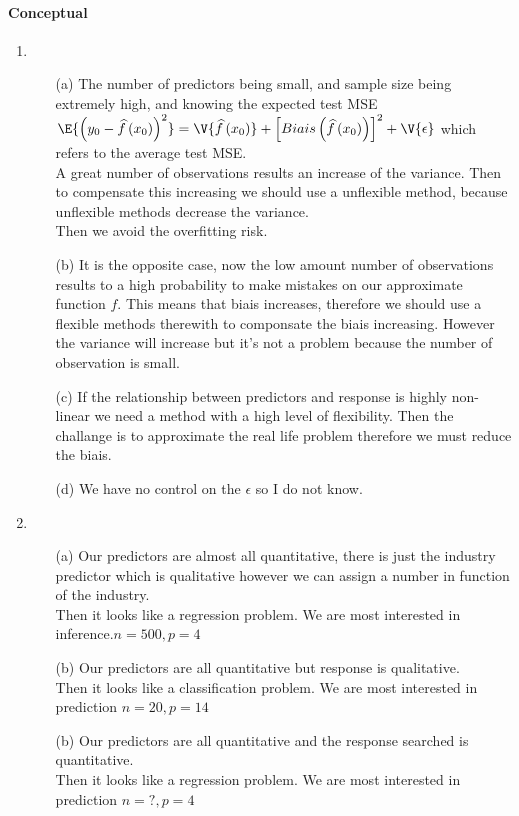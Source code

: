 \paragraph{Conceptual}
\begin{enumerate}
 \item
   \begin{itemize}
     \item[(a)] The number of predictors being small, and sample size
being extremely high, and knowing the expected test MSE $\E{\left( 
y_{0}-\widehat{f}\left( x_{0} \right) \right)^{2}}=\V{\widehat{f}\left(
x_{0} \right)}+\left[ Biais\left( \widehat{f}\left( x_{0} \right)
\right) \right]^{2}+\V{\epsilon}$ which refers to the average test MSE.
\\A great number of observations results an increase of the variance.
Then to compensate this increasing we should use a unflexible method,
because unflexible methods decrease the variance.\\Then we avoid the
overfitting risk.
\item[(b)] It is the opposite case, now the low amount number of
observations results to a high probability to make mistakes on our
approximate function $f$. This means that biais increases, therefore
we should use a flexible methods therewith to componsate the biais
increasing. However the variance will increase but it's not a problem
because the number of observation is small.
\item[(c)] If the relationship between predictors and response is
highly non-linear we need a method with a high level of flexibility.
Then the challange is to approximate the real life problem therefore we
must reduce the biais.
\item[(d)] We have no control on the $\epsilon$ so I do not know.
   \end{itemize}
 \item
   \begin{itemize}
     \item[(a)] Our predictors are almost all quantitative, there is
just the industry predictor which is qualitative however we can assign
a number in function of the industry.\\Then it looks like a regression
problem. We are most interested in inference.$n=500,p=4$
\item[(b)] Our predictors are all quantitative but response is
qualitative.\\Then it looks like a classification problem. We are most
interested in prediction $n=20,p=14$
\item[(b)] Our predictors are all quantitative and the response 
searched is quantitative.\\Then it looks like a
regression problem. We are most interested in prediction $n=?,p=4$
   \end{itemize}
 \end{enumerate}
